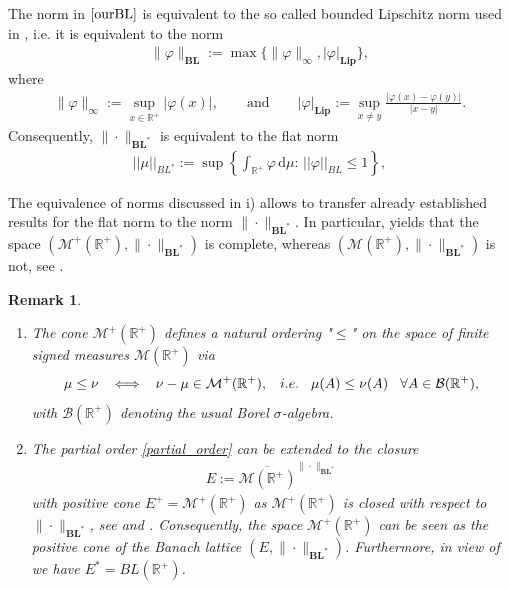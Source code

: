 \documentclass[12pt,a4paper]{amsart}
\newcommand{\ud}{\mathrm{d}}
\newtheorem{remark}[theorem]{Remark}
\newcommand{\BL}{\mathbf{BL}}
\newcommand{\BLN}{\mathbf{BL}}
\newcommand{\Lip}{\mathbf{Lip}} 				%
\renewcommand{\phi}{\varphi}
\newcommand{\R}{\mathbb{R}}
\begin{document}
\item[i)] {\color{blue}
The norm in $\eqref{ourBL}$ is equivalent to the so called bounded Lipschitz norm used in \cite{Duell_book, M3AS_measures}, i.e. it is equivalent to the norm
    \begin{align*}
    \|\phi\|_{\BL}:=\max\{ \|\phi\|_{\infty}, |\phi|_{\Lip}\},
    \end{align*}
where 
    \begin{align*}
    \|\phi\|_{\infty}:=\displaystyle\sup_{x\in\R^+}\left|\phi(x)\right|,\qquad \text{and} \qquad
    |\phi|_{\Lip}:=\displaystyle\sup_{x\neq y}\frac{|\phi(x)-\phi(y)|}{|x-y|}.
    \end{align*}
Consequently, $\|\cdot\|_{\BLN^*}$ is equivalent to the flat norm 
    \begin{align*}
    ||\mu||_{BL^*}:=\sup\left\{\int_{\R^+}\phi\,\ud \mu:\,||\phi||_{BL}\le 1\right\},
    \end{align*}}
\item [iii)]  {\color{blue}The equivalence of norms discussed in i) allows to transfer already established results for the flat norm to the norm $\|\cdot\|_{\BLN^*}$. In particular, \cite[Thm 1.61]{Duell_book} yields that the space $(\mathcal{M}^+(\R^+),\|\cdot\|_{\BLN^*})$ is complete, whereas  $(\mathcal{M}(\R^+),\|\cdot\|_{\BLN^*})$ is not, see \cite[Thm 1.36]{Duell_book}. } \fi
    
\begin{remark}
\begin{enumerate}
\item [i)]  The cone $\mathcal{M}^+(\R^+)$ defines a natural ordering "$\leq$" on the space of finite signed measures $\mathcal{M}(\R^+)$ via
\begin{align}
\label{partial_order}
       \mu\leq \nu \hspace{0.3cm} \Longleftrightarrow \hspace{0.3cm} \nu-\mu\in \mathcal{M}^+(\R^+), \hspace{0.3cm} i.e.\hspace{0.3cm} \mu(A)\leq \nu(A)\hspace{0.3cm} \forall A\in \mathcal{B}(\R^+),
    \end{align}
with $\mathcal{B}(\R^+)$ denoting the usual Borel $\sigma$-algebra. 
\item [ii)] \label{remark:measure_space} The partial order \eqref{partial_order} can be extended to the closure 
    \begin{align*}
    E:=\overline{\mathcal{M}(\R^+)}^{\|\cdot\|_{\BLN^*}}
    \end{align*}
with positive cone $E^+=\mathcal{M}^+(\R^+)$ as $\mathcal{M}^+(\R^+)$ is closed with respect to $\|\cdot\|_{\BLN^*}$, see \cite{vanGaans} and \cite[Thm G.42]{Duell_book}. Consequently, the space $\mathcal{M}^+(\R^+)$ can be seen as the positive cone of the Banach lattice $(E,\|\cdot\|_{\BLN^*})$. Furthermore, in view of  \cite[Thm 1.41]{Duell_book} we  have $E^*=BL(\R^+)$.
\end{enumerate}
\end{remark}
\end{document}

